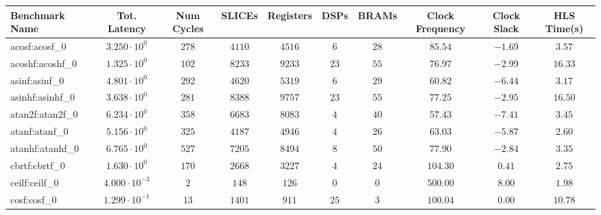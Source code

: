 \begin{tabular}{|l|c|c|c|c|c|c|c|c|c|}
\hline
Benchmark Name               & Tot. Latency            & Num Cycles & SLICEs     & Registers  & DSPs    & BRAMs   & Clock Frequency & Clock Slack & HLS Time(s) \\
\hline
acosf:acosf\_0               & $ 3.250 \cdot 10^{0}  $ & $ 278    $ & $ 4110   $ & $ 4516   $ & $ 6   $ & $ 28  $ & $ 85.54       $ & $ -1.69   $ & $ 3.57    $ \\
acoshf:acoshf\_0             & $ 1.325 \cdot 10^{0}  $ & $ 102    $ & $ 8233   $ & $ 9233   $ & $ 23  $ & $ 55  $ & $ 76.97       $ & $ -2.99   $ & $ 16.33   $ \\
asinf:asinf\_0               & $ 4.801 \cdot 10^{0}  $ & $ 292    $ & $ 4620   $ & $ 5319   $ & $ 6   $ & $ 29  $ & $ 60.82       $ & $ -6.44   $ & $ 3.17    $ \\
asinhf:asinhf\_0             & $ 3.638 \cdot 10^{0}  $ & $ 281    $ & $ 8388   $ & $ 9757   $ & $ 23  $ & $ 55  $ & $ 77.25       $ & $ -2.95   $ & $ 16.50   $ \\
atan2f:atan2f\_0             & $ 6.234 \cdot 10^{0}  $ & $ 358    $ & $ 6683   $ & $ 8083   $ & $ 4   $ & $ 40  $ & $ 57.43       $ & $ -7.41   $ & $ 3.45    $ \\
atanf:atanf\_0               & $ 5.156 \cdot 10^{0}  $ & $ 325    $ & $ 4187   $ & $ 4946   $ & $ 4   $ & $ 26  $ & $ 63.03       $ & $ -5.87   $ & $ 2.60    $ \\
atanhf:atanhf\_0             & $ 6.765 \cdot 10^{0}  $ & $ 527    $ & $ 7205   $ & $ 8494   $ & $ 8   $ & $ 50  $ & $ 77.90       $ & $ -2.84   $ & $ 3.35    $ \\
cbrtf:cbrtf\_0               & $ 1.630 \cdot 10^{0}  $ & $ 170    $ & $ 2668   $ & $ 3227   $ & $ 4   $ & $ 24  $ & $ 104.30      $ & $ 0.41    $ & $ 2.75    $ \\
ceilf:ceilf\_0               & $ 4.000 \cdot 10^{-3} $ & $ 2      $ & $ 148    $ & $ 126    $ & $ 0   $ & $ 0   $ & $ 500.00      $ & $ 8.00    $ & $ 1.98    $ \\
cosf:cosf\_0                 & $ 1.299 \cdot 10^{-1} $ & $ 13     $ & $ 1401   $ & $ 911    $ & $ 25  $ & $ 3   $ & $ 100.04      $ & $ 0.00    $ & $ 10.78   $ \\

\end{tabular}
